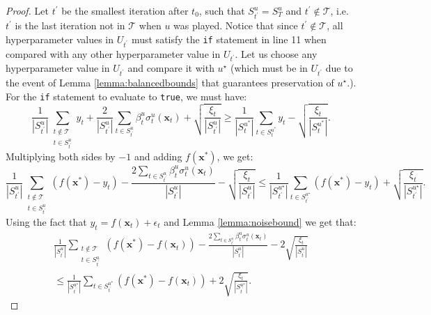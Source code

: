 \documentclass{article}
\theoremstyle{plain}
\theoremstyle{definition}
\theoremstyle{remark}
\theoremstyle{plain}
\begin{document}
\begin{proof}
    Let $t^\prime$ be the smallest iteration after $t_0$, such that $S_{t^\prime}^u = S_T^u$ and $t^\prime \notin \mathcal{T}$, i.e. $t^\prime$ is the last iteration not in $\mathcal{T}$ when $u$ was played.  Notice that since $t^\prime \notin \mathcal{T}$, all hyperparameter values in $U_{t^\prime}$ must satisfy the \texttt{if} statement in line 11 when compared with any other hyperparameter value in $U_{t^\prime}$. Let us choose any hyperparameter value in $U_{t^\prime}$ and compare it with $u^\star$ (which must be in $U_{t^\prime}$ due to the event of Lemma \ref{lemma:balancedbounds} that guarantees preservation of $u^\star$.). For the \texttt{if} statement to evaluate to \texttt{true}, we must have:
\begin{equation*}
      \frac{1}{|S_{t^\prime}^{u}|} \sum_{\substack{t \notin \mathcal{T} \\     t \in S_{t^\prime}^{u}}} y_t + \frac{2}{|S_{t^\prime}^{u}|}  \sum_{t \in S_{t^\prime}^{u}} \beta_t^{u}\sigma_t^{u}(\bm{x}_t) + \sqrt{\frac{\xi_t}{|S_{t^\prime}^{u}|}}  \ge\frac{1}{|S_t^{u^*}|} \sum_{t \in S_t^{u^*}}  y_t   - \sqrt{\frac{\xi_t}{|S_t^{u^*}|} } .
\end{equation*}
Multiplying both sides by $-1$ and adding $f(\bm{x}^*)$, we get:
\begin{equation*}
      \frac{1}{|S_{t^\prime}^{u}|} \sum_{\substack{t \notin \mathcal{T} \\     t \in S_{t^\prime}^{u}}} \left(f(\bm{x}^*) - y_t\right) - \frac{2\sum_{t \in S_{t^\prime}^{u}} \beta_t^{u}\sigma_t^{u}(\bm{x}_t) }{|S_{t^\prime}^{u}|}   - \sqrt{\frac{\xi_t}{|S_{t^\prime}^{u}|}}  \le \frac{1}{|S_{t^\prime}^{u^\star}|} \sum_{t \in S_{t^\prime}^{u^\star}} \left(f(\bm{x}^*) - y_t \right)  + \sqrt{\frac{\xi_t}{|S_{t^\prime}^{u^\star}|} } .
\end{equation*}
Using the fact that $y_t = f(\bm{x}_t) + \epsilon_t$ and Lemma \ref{lemma:noisebound} we get that:
\begin{align*}
      \frac{1}{|S_{t^\prime}^{u}|} \sum_{\substack{t \notin \mathcal{T} \\     t \in S_{t^\prime}^{u}}} \left(f(\bm{x}^*) - f(\bm{x}_t)\right) -\frac{2\sum_{t \in S_{t^\prime}^{u}} \beta_t^{u}\sigma_t^{u}(\bm{x}_t) }{|S_{t^\prime}^{u}|}  - 2\sqrt{\frac{\xi_t}{|S_{t^\prime}^{u}|}}  \\
      \le \frac{1}{|S_{t^\prime}^{u^\star}|} \sum_{t \in S_{t^\prime}^{u^\star}} \left(f(\bm{x}^*) - f(\bm{x}_t) \right)  + 2\sqrt{\frac{\xi_t}{|S_{t^\prime}^{u^\star}|} } .

\end{align*}
\end{proof}
\end{document}
